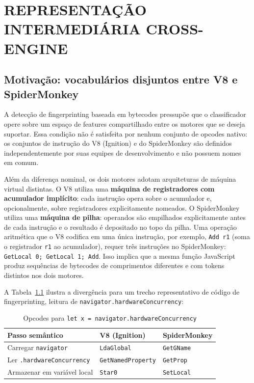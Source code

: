 \chapter{REPRESENTAÇÃO INTERMEDIÁRIA CROSS-ENGINE}
\label{cap:ir}

\section{Motivação: vocabulários disjuntos entre V8 e SpiderMonkey}
\label{sec:ir-motivacao}

A detecção de fingerprinting baseada em bytecodes pressupõe que o
classificador opere sobre um espaço de features compartilhado entre os motores que
se deseja suportar. Essa condição não é satisfeita por nenhum conjunto de opcodes
nativo: os conjuntos de instrução do V8 (Ignition) e do SpiderMonkey são definidos
independentemente por suas equipes de desenvolvimento e não possuem nomes em comum.

Além da diferença nominal, os dois motores adotam arquiteturas de máquina virtual
distintas. O V8 utiliza uma \textbf{máquina de registradores com acumulador
implícito}: cada instrução opera sobre o acumulador e, opcionalmente, sobre
registradores explicitamente nomeados. O SpiderMonkey utiliza uma \textbf{máquina
de pilha}: operandos são empilhados explicitamente antes de cada instrução e o
resultado é depositado no topo da pilha. Uma operação aritmética que o V8 codifica
em uma única instrução, por exemplo, \texttt{Add r1} (soma o registrador
\texttt{r1} ao acumulador), requer três instruções no SpiderMonkey:
\texttt{GetLocal 0; GetLocal 1; Add}. Isso implica que a mesma função JavaScript
produz sequências de bytecodes de comprimentos diferentes e com tokens distintos
nos dois motores.

A Tabela~\ref{tab:opcodes-divergencia} ilustra a divergência para um trecho
representativo de código de fingerprinting, leitura de
\texttt{navigator.hardwareConcurrency}:

\begin{table}[htb]
\centering
\caption{Opcodes para \texttt{let x = navigator.hardwareConcurrency}}
\label{tab:opcodes-divergencia}
\begin{tabular}{lll}
\toprule
\textbf{Passo semântico} & \textbf{V8 (Ignition)} & \textbf{SpiderMonkey} \\
\midrule
Carregar \texttt{navigator}           & \texttt{LdaGlobal}       & \texttt{GetGName} \\
Ler \texttt{.hardwareConcurrency}     & \texttt{GetNamedProperty} & \texttt{GetProp} \\
Armazenar em variável local           & \texttt{Star0}            & \texttt{SetLocal} \\
\bottomrule
\end{tabular}
\end{table}

